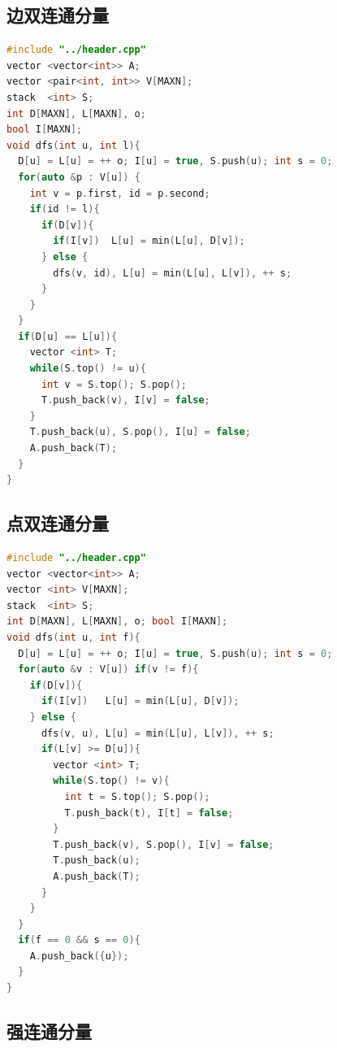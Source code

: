 \documentclass[10pt]{ctexart}
\begin{document}
\begin{multicols}{3}
    \subsection{边双连通分量}\label{ux8fb9ux53ccux8fdeux901aux5206ux91cf}

\begin{lstlisting}[language={C++}]
#include "../header.cpp"
vector <vector<int>> A;
vector <pair<int, int>> V[MAXN];
stack  <int> S;
int D[MAXN], L[MAXN], o;
bool I[MAXN];
void dfs(int u, int l){
  D[u] = L[u] = ++ o; I[u] = true, S.push(u); int s = 0;
  for(auto &p : V[u]) {
    int v = p.first, id = p.second;
    if(id != l){
      if(D[v]){
        if(I[v])  L[u] = min(L[u], D[v]);
      } else {
        dfs(v, id), L[u] = min(L[u], L[v]), ++ s;
      }
    }
  }
  if(D[u] == L[u]){
    vector <int> T;
    while(S.top() != u){
      int v = S.top(); S.pop();
      T.push_back(v), I[v] = false;
    }
    T.push_back(u), S.pop(), I[u] = false;
    A.push_back(T);
  }
}
\end{lstlisting}

    \subsection{点双连通分量}\label{ux70b9ux53ccux8fdeux901aux5206ux91cf}

\begin{lstlisting}[language={C++}]
#include "../header.cpp"
vector <vector<int>> A;
vector <int> V[MAXN];
stack  <int> S;
int D[MAXN], L[MAXN], o; bool I[MAXN];
void dfs(int u, int f){
  D[u] = L[u] = ++ o; I[u] = true, S.push(u); int s = 0;
  for(auto &v : V[u]) if(v != f){
    if(D[v]){
      if(I[v])   L[u] = min(L[u], D[v]);
    } else {
      dfs(v, u), L[u] = min(L[u], L[v]), ++ s;
      if(L[v] >= D[u]){
        vector <int> T;
        while(S.top() != v){
          int t = S.top(); S.pop();
          T.push_back(t), I[t] = false;
        }
        T.push_back(v), S.pop(), I[v] = false;
        T.push_back(u);
        A.push_back(T);
      }
    }
  }
  if(f == 0 && s == 0){
    A.push_back({u});
  }
}
\end{lstlisting}

    \subsection{强连通分量}\label{ux5f3aux8fdeux901aux5206ux91cf}


\end{multicols}
\end{document}
